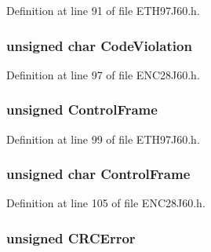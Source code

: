 Definition at line 91 of file E\+T\+H97\+J60.\+h.

\hypertarget{union_r_x_s_t_a_t_u_s_abf8a0bb18e0f19552522eb5fce572373}{}
\subsubsection[{Code\+Violation}]{\setlength{\rightskip}{0pt plus 5cm}unsigned char Code\+Violation}\label{union_r_x_s_t_a_t_u_s_abf8a0bb18e0f19552522eb5fce572373}


Definition at line 97 of file E\+N\+C28\+J60.\+h.

\hypertarget{union_r_x_s_t_a_t_u_s_a4c4b64b10bc5357f9b36b50c226d6cfe}{}
\subsubsection[{Control\+Frame}]{\setlength{\rightskip}{0pt plus 5cm}unsigned Control\+Frame}\label{union_r_x_s_t_a_t_u_s_a4c4b64b10bc5357f9b36b50c226d6cfe}


Definition at line 99 of file E\+T\+H97\+J60.\+h.

\hypertarget{union_r_x_s_t_a_t_u_s_a236f7c5d2c3bdaea92fe00c6f4de7a4e}{}
\subsubsection[{Control\+Frame}]{\setlength{\rightskip}{0pt plus 5cm}unsigned char Control\+Frame}\label{union_r_x_s_t_a_t_u_s_a236f7c5d2c3bdaea92fe00c6f4de7a4e}


Definition at line 105 of file E\+N\+C28\+J60.\+h.

\hypertarget{union_r_x_s_t_a_t_u_s_aa5896904d6330e5645e90f4c9e761411}{}
\subsubsection[{C\+R\+C\+Error}]{\setlength{\rightskip}{0pt plus 5cm}unsigned C\+R\+C\+Error}\label{union_r_x_s_t_a_t_u_s_aa5896904d6330e5645e90f4c9e761411}


